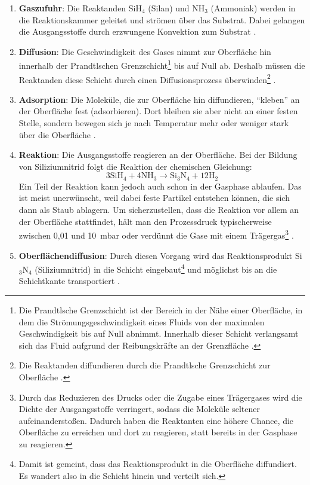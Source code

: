\documentclass{article} %
\begin{document}
\begin{enumerate}
    \item \textbf{Gaszufuhr}: Die Reaktanden SiH$_4$ (Silan) und NH$_3$ (Ammoniak) werden in die Reaktionskammer geleitet und strömen über das Substrat. Dabei gelangen die Ausgangsstoffe durch erzwungene Konvektion zum Substrat \cite{keplinger2024CVD}.
    \item \textbf{Diffusion}: Die Geschwindigkeit des Gases nimmt zur Oberfläche hin innerhalb der Prandtlschen Grenzschicht\footnote{Die Prandtlsche Grenzschicht ist der Bereich in der Nähe einer Oberfläche, in dem die Strömungsgeschwindigkeit eines Fluids von der maximalen Geschwindigkeit bis auf Null abnimmt. Innerhalb dieser Schicht verlangsamt sich das Fluid aufgrund der Reibungskräfte an der Grenzfläche \cite{white2006}.} bis auf Null ab. Deshalb müssen die Reaktanden diese Schicht durch einen Diffusionsprozess überwinden\footnote{Die Reaktanden diffundieren durch die Prandtlsche Grenzschicht zur Oberfläche \cite{bergman2011, incropera2007}.} \cite{keplinger2024CVD}.
    \item \textbf{Adsorption}: Die Moleküle, die zur Oberfläche hin diffundieren, ``kleben'' an der Oberfläche fest (adsorbieren). Dort bleiben sie aber nicht an einer festen Stelle, sondern bewegen sich je nach Temperatur mehr oder weniger stark über die Oberfläche \cite{keplinger2024CVD, bergman2011, incropera2007}.
    \item \textbf{Reaktion}: Die Ausgangsstoffe reagieren an der Oberfläche. Bei der Bildung von Siliziumnitrid folgt die Reaktion der chemischen Gleichung:
    $$
    3\mathrm{SiH}_4 + 4\mathrm{NH}_3 \rightarrow \mathrm{Si}_3\mathrm{N}_4 + 12\mathrm{H}_2
    $$
    Ein Teil der Reaktion kann jedoch auch schon in der Gasphase ablaufen. Das ist meist unerwünscht, weil dabei feste Partikel entstehen können, die sich dann als Staub ablagern. Um sicherzustellen, dass die Reaktion vor allem an der Oberfläche stattfindet, hält man den Prozessdruck typischerweise zwischen 0,01 und 10~mbar oder verdünnt die Gase mit einem Trägergas\footnote{Durch das Reduzieren des Drucks oder die Zugabe eines Trägergases wird die Dichte der Ausgangsstoffe verringert, sodass die Moleküle seltener aufeinanderstoßen. Dadurch haben die Reaktanten eine höhere Chance, die Oberfläche zu erreichen und dort zu reagieren, statt bereits in der Gasphase zu reagieren.} \cite{keplinger2024CVD}.
    \item \textbf{Oberflächendiﬀusion}: Durch diesen Vorgang wird das Reaktionsprodukt Si$_3$N$_4$ (Siliziumnitrid) in die Schicht eingebaut\footnote{Damit ist gemeint, dass das Reaktionsprodukt in die Oberfläche diffundiert. Es wandert also in die Schicht hinein und verteilt sich.} und möglichst bis an die Schichtkante transportiert \cite{keplinger2024CVD}.

\end{enumerate}
\end{document}
